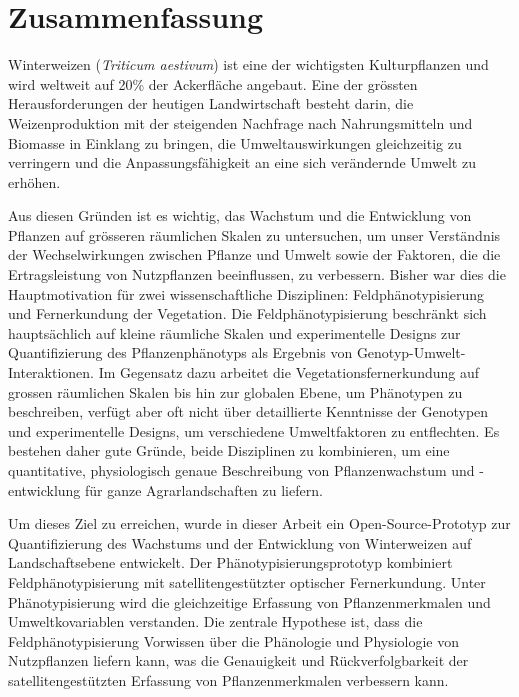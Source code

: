 \chapter*{Zusammenfassung}

Winterweizen (\textsl{Triticum aestivum}) ist eine der wichtigsten Kulturpflanzen und wird weltweit auf 20\% der Ackerfläche angebaut. Eine der grössten Herausforderungen der heutigen Landwirtschaft besteht darin, die Weizenproduktion mit der steigenden Nachfrage nach Nahrungsmitteln und Biomasse in Einklang zu bringen, die Umweltauswirkungen gleichzeitig zu verringern und die Anpassungsfähigkeit an eine sich verändernde Umwelt zu erhöhen.

Aus diesen Gründen ist es wichtig, das Wachstum und die Entwicklung von Pflanzen auf grösseren räumlichen Skalen zu untersuchen, um unser Verständnis der Wechselwirkungen zwischen Pflanze und Umwelt sowie der Faktoren, die die Ertragsleistung von Nutzpflanzen beeinflussen, zu verbessern. Bisher war dies die Hauptmotivation für zwei wissenschaftliche Disziplinen: Feldphänotypisierung und Fernerkundung der Vegetation. Die Feldphänotypisierung beschränkt sich hauptsächlich auf kleine räumliche Skalen und experimentelle Designs zur Quantifizierung des Pflanzenphänotyps als Ergebnis von Genotyp-Umwelt-Interaktionen. Im Gegensatz dazu arbeitet die Vegetationsfernerkundung auf grossen räumlichen Skalen bis hin zur globalen Ebene, um Phänotypen zu beschreiben, verfügt aber oft nicht über detaillierte Kenntnisse der Genotypen und experimentelle Designs, um verschiedene Umweltfaktoren zu entflechten. Es bestehen daher gute Gründe, beide Disziplinen zu kombinieren, um eine quantitative, physiologisch genaue Beschreibung von Pflanzenwachstum und -entwicklung für ganze Agrarlandschaften zu liefern.

Um dieses Ziel zu erreichen, wurde in dieser Arbeit ein Open-Source-Prototyp zur Quantifizierung des Wachstums und der Entwicklung von Winterweizen auf Landschaftsebene entwickelt. Der Phänotypisierungsprototyp kombiniert Feldphänotypisierung mit satellitengestützter optischer Fernerkundung. Unter Phänotypisierung wird die gleichzeitige Erfassung von Pflanzenmerkmalen und Umweltkovariablen verstanden. Die zentrale Hypothese ist, dass die Feldphänotypisierung Vorwissen über die Phänologie und Physiologie von Nutzpflanzen liefern kann, was die Genauigkeit und Rückverfolgbarkeit der satellitengestützten Erfassung von Pflanzenmerkmalen verbessern kann.

